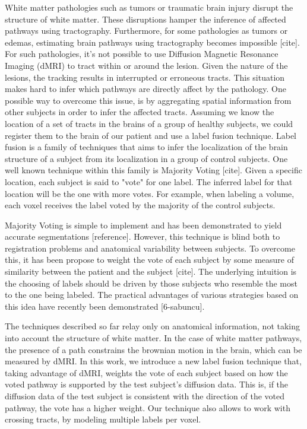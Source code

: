 White matter pathologies such as tumors or traumatic brain injury disrupt the
structure of white matter. These disruptions hamper the inference of affected
pathways using tractography. Furthermore, for some pathologies as tumors or
edemas, estimating brain pathways using tractography becomes impossible [cite].
For such pathologies, it's not possible to use Diffusion Magnetic Resonance
Imaging (dMRI) to tract within or around the lesion. Given the nature of the
lesions, the tracking results in interrupted or erroneous tracts. This situation
makes hard to infer which pathways are directly affect by the pathology. One
possible way to overcome this issue, is by aggregating spatial information
from other subjects in order to infer the affected tracts. Assuming we know the
location of a set of tracts in the brains of a group of healthy subjects, we
could register them to the brain of our patient and use a label fusion technique.
Label fusion is a family of techniques that aims to infer the localization of the
 brain structure of a subject from its localization in a group of control subjects.
One well known technique within this family is Majority Voting [cite]. Given a
specific location, each subject is said to "vote" for one label. The inferred
label for that location will be the one with more votes. For example, when
labeling a volume, each voxel receives the label voted by the majority of the
control subjects.

Majority Voting is simple to implement and has been demonstrated to yield
accurate segmentations [reference]. However, this technique is blind both to
registration problems and anatomical variability between subjects. To overcome
this, it has been propose to weight the vote of each subject by some measure of
 similarity between the patient and the subject [cite]. The underlying
intuition is the choosing of labels should be driven by those subjects who
resemble the most to the one being labeled. The practical advantages of various
strategies based on this idea have recently been demonstrated [6-sabuncu].

The techniques described so far relay only on anatomical information, not taking 
into account the structure of white matter. In the case of white matter pathways,
the presence of a path constrains the brownian motion in the brain, which can be
measured by dMRI. In this work, we introduce a new label fusion technique that,
taking advantage of dMRI, weights the vote of each subject based on how the voted
pathway is supported by the test subject's diffusion data. This is, if the
diffusion data of the test subject is consistent with the direction of the voted
pathway, the vote has a higher weight. Our technique also allows to work with
crossing tracts, by modeling multiple labels per voxel.

